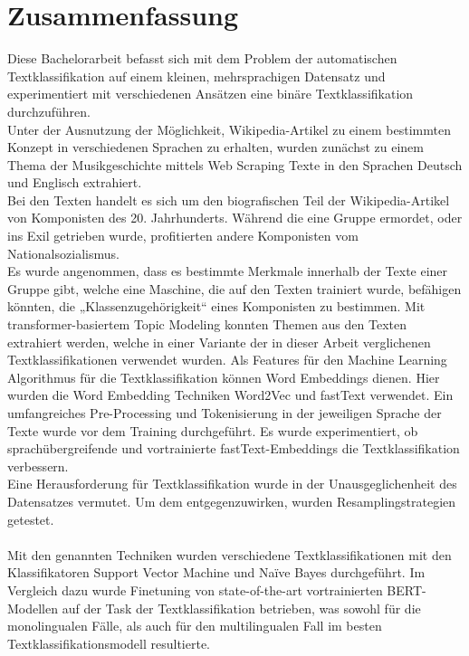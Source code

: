 \documentclass[ngerman]{ttlab-qualify}
\begin{document}
\chapter*{\centering Zusammenfassung}
Diese Bachelorarbeit befasst sich mit dem Problem der automatischen Textklassifikation auf einem kleinen, mehrsprachigen Datensatz und experimentiert mit verschiedenen Ansätzen eine binäre Textklassifikation durchzuführen.\\ 
Unter der Ausnutzung der Möglichkeit, Wikipedia-Artikel zu einem bestimmten Konzept in verschiedenen Sprachen zu erhalten, wurden zunächst zu einem Thema der Musikgeschichte mittels Web Scraping Texte in den Sprachen Deutsch und Englisch extrahiert.\\
Bei den Texten handelt es sich um den biografischen Teil der Wikipedia-Artikel von Komponisten des 20. Jahrhunderts. Während die eine Gruppe ermordet, oder ins Exil getrieben wurde, profitierten andere Komponisten vom Nationalsozialismus.\\
Es wurde angenommen, dass es bestimmte Merkmale innerhalb der Texte einer Gruppe gibt, welche eine Maschine, die auf den Texten trainiert wurde, befähigen könnten, die „Klassenzugehörigkeit“ eines Komponisten zu bestimmen. Mit transformer-basiertem Topic Modeling konnten Themen aus den Texten extrahiert werden, welche in einer Variante der in dieser Arbeit verglichenen Textklassifikationen verwendet wurden. Als Features für den Machine Learning Algorithmus für die Textklassifikation können Word Embeddings dienen. Hier wurden die Word Embedding Techniken Word2Vec und fastText verwendet. Ein umfangreiches Pre-Processing und Tokenisierung in der jeweiligen Sprache der Texte wurde vor dem Training durchgeführt. Es wurde experimentiert, ob sprachübergreifende und vortrainierte fastText-Embeddings die Textklassifikation verbessern.\\ 
Eine Herausforderung für Textklassifikation wurde in der Unausgeglichenheit des Datensatzes vermutet. Um dem entgegenzuwirken, wurden Resamplingstrategien getestet.\\
\\
Mit den genannten Techniken wurden verschiedene Textklassifikationen mit den Klassifikatoren Support Vector Machine und Naïve Bayes durchgeführt. 
Im Vergleich dazu wurde Finetuning von state-of-the-art vortrainierten BERT-Modellen auf der Task der Textklassifikation betrieben, was sowohl für die monolingualen Fälle, als auch für den multilingualen Fall im besten Textklassifikationsmodell resultierte.
\end{document}
